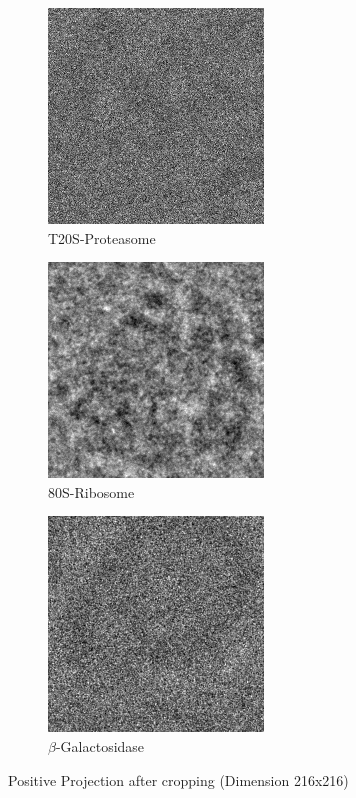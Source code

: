 \documentclass[twoside]{iitbreport}
\begin{document}
\begin{figure}[h]
\centering
\begin{subfigure}{.5\textwidth}
\centering
\includegraphics[width=0.5\linewidth]{pos-EM-10025.png}
\captionsetup{justification=centering}
\caption{ T20S-Proteasome }
\end{subfigure} 
\begin{subfigure}{.48\textwidth}
\centering
\includegraphics[width=0.5\linewidth]{pos-EM-10028.png}
\captionsetup{justification=centering}
\caption{ 80S-Ribosome }
\end{subfigure}
\begin{subfigure}{.5\textwidth}
\centering
\includegraphics[width=0.5\linewidth]{pos-EM-10012.png}
\captionsetup{justification=centering}
\caption{$\beta$-Galactosidase }
\end{subfigure}
\captionsetup{justification=centering}
\caption{ Positive Projection after cropping (Dimension 216x216)}
\label{fig:Positive-Projection}
\end{figure}
\end{document}
